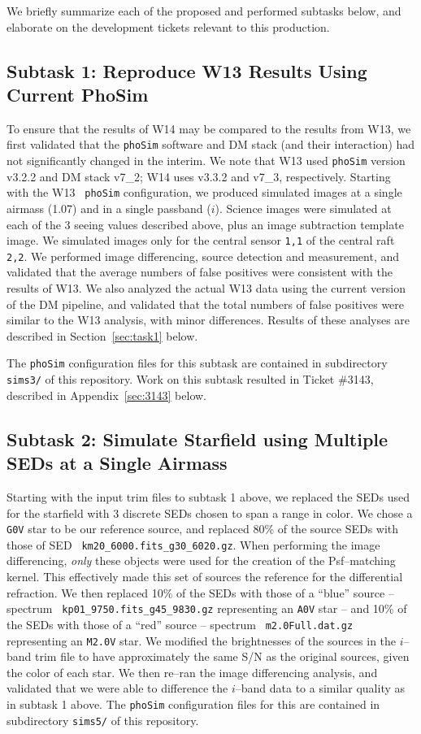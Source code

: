 \documentclass[prd, nofootinbib, floatfix, 11pt, tightenlines, times]{article}
\begin{document}
We briefly summarize each of the proposed and performed subtasks
below, and elaborate on the development tickets relevant to this
production.

\subsection{Subtask 1: Reproduce W13 Results Using Current PhoSim}

To ensure that the results of W14 may be compared to the results from
W13, we first validated that the {\tt phoSim} software and DM stack
(and their interaction) had not significantly changed in the interim.
We note that W13 used {\tt phoSim} version v3.2.2 and DM stack v7\_2;
W14 uses v3.3.2 and v7\_3, respectively.  Starting with the W13 {\tt
  phoSim} configuration, we produced simulated images at a single
airmass (1.07) and in a single passband ($i$).  Science images were
simulated at each of the 3 seeing values described above, plus an
image subtraction template image.  We simulated images only for the
central sensor {\tt 1,1} of the central raft {\tt 2,2}.  We performed
image differencing, source detection and measurement, and validated
that the average numbers of false positives were consistent with the
results of W13.  We also analyzed the actual W13 data using the
current version of the DM pipeline, and validated that the total
numbers of false positives were similar to the W13 analysis, with
minor differences.  Results of these analyses are described in
Section~\ref{sec:task1} below.

The {\tt phoSim} configuration files for this subtask are contained in
subdirectory {\tt sims3/} of this repository.  Work on this subtask
resulted in Ticket \#3143, described in Appendix~\ref{sec:3143} below.

\subsection{Subtask 2: Simulate Starfield using Multiple SEDs at a Single Airmass}

Starting with the input trim files to subtask 1 above, we replaced the
SEDs used for the starfield with 3 discrete SEDs chosen to span a
range in color.  We chose a {\tt G0V} star to be our reference source,
and replaced 80\% of the source SEDs with those of SED {\tt
  km20\_6000.fits\_g30\_6020.gz}.  When performing the image
differencing, {\it only} these objects were used for the creation of
the Psf--matching kernel.  This effectively made this set of sources
the reference for the differential refraction.  We then replaced 10\%
of the SEDs with those of a ``blue'' source -- spectrum {\tt
  kp01\_9750.fits\_g45\_9830.gz} representing an {\tt A0V} star -- and
10\% of the SEDs with those of a ``red'' source -- spectrum {\tt
  m2.0Full.dat.gz} representing an {\tt M2.0V} star.  We modified the
brightnesses of the sources in the $i$--band trim file to have
approximately the same S/N as the original sources, given the color of
each star.  We then re--ran the image differencing analysis, and
validated that we were able to difference the $i$--band data to a
similar quality as in subtask 1 above.  The {\tt phoSim} configuration
files for this are contained in subdirectory {\tt sims5/} of this
repository.
\end{document}
